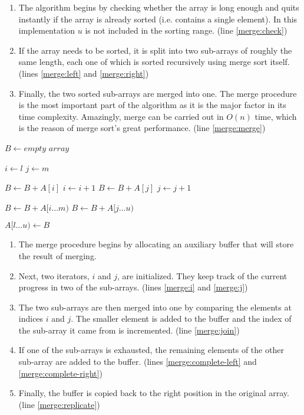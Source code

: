 \begin{enumerate}
    \item The algorithm begins by checking whether the array is long enough and quits instantly if the array is already sorted (i.e. contains a single element). In this implementation $u$ is not included in the sorting range. (line \ref{merge:check})
    \item If the array needs to be sorted, it is split into two sub-arrays of roughly the same length, each one of which is sorted recursively using merge sort itself. (lines \ref{merge:left} and \ref{merge:right})
    \item Finally, the two sorted sub-arrays are merged into one. The merge procedure is the most important part of the algorithm as it is the major factor in its time complexity. Amazingly, merge can be carried out in $O(n)$ time, which is the reason of merge sort's great performance. (line \ref{merge:merge})
\end{enumerate}

\begin{algorithmic}[1]
        \State $B \gets empty$ $array$ \label{merge:buffer}

        \State $i \gets l$ \label{merge:i}
        \State $j \gets m$ \label{merge:j}

         \label{merge:join}
                \State $B \gets B + A[i]$
                \State $i \gets i + 1$
            \Else
                \State $B \gets B + A[j]$
                \State $j \gets j + 1$
            \EndIf
        \EndWhile

        \State $B \gets B + A[i \dots m)$ \label{merge:complete-left}
        \State $B \gets B + A[j \dots u)$ \label{merge:complete-right}

        \State $A[l \dots u) \gets B$ \label{merge:replicate}
    \EndFunction
\end{algorithmic}

\begin{enumerate}
    \item The merge procedure begins by allocating an auxiliary buffer that will store the result of merging.
    \item Next, two iterators, $i$ and $j$, are initialized. They keep track of the current progress in two of the sub-arrays. (lines \ref{merge:i} and \ref{merge:j})
    \item The two sub-arrays are then merged into one by comparing the elements at indices $i$ and $j$. The smaller element is added to the buffer and the index of the sub-array it came from is incremented. (line \ref{merge:join})
    \item If one of the sub-arrays is exhausted, the remaining elements of the other sub-array are added to the buffer. (lines \ref{merge:complete-left} and \ref{merge:complete-right})
    \item Finally, the buffer is copied back to the right position in the original array. (line \ref{merge:replicate})
\end{enumerate}


